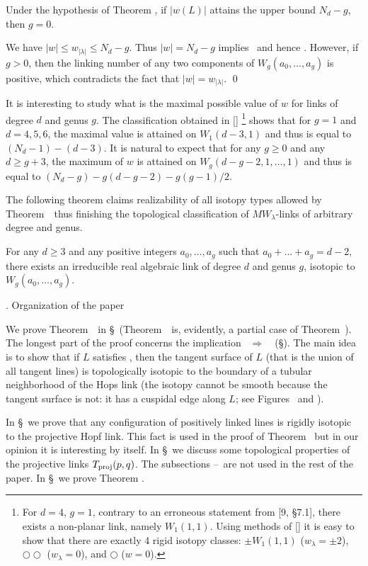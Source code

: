  Under the hypothesis of Theorem \thAnyGenus, if $|w(L)|$ attains
the upper bound $N_d-g$, then $g=0$.
\endproclaim

 We have $|w|\le w_{|\lambda|}\le N_d-g$. Thus $|w|=N_d-g$ implies \CondW\ and hence \CondTA.
However, if $g>0$, then the linking number of any two components of $W_g(a_0,\dots,a_g)$
is positive, which contradicts the fact that $|w|=w_{|\lambda|}$.
\qed\enddemo

It is interesting to study what is the maximal possible value of $w$ for links of degree $d$ and genus $g$.
The classification obtained in []
%
\footnote{For $d=4$, $g=1$, contrary to an erroneous statement from [9, \S 7.1], there
exists a non-planar link, namely $W_1(1,1)$. Using methods of [] it is easy to show
that there are exactly 4 rigid isotopy classes: $\pm W_1(1,1)$ ($w_\lambda=\pm2$),
$\bigcirc\bigcirc$ ($w_\lambda=0$), and $\bigcirc$ ($w=0$).}
shows that for $g=1$ and $d=4,5,6$, the maximal value
is attained on $W_1(d-3,1)$ and thus is equal to $(N_d-1)-(d-3)$. It is natural to expect that for any $g\ge0$ and
any $d\ge g+3$, the maximum of $w$ is attained on $W_g(d-g-2,1,\dots,1)$ and thus is equal to
$(N_d-g) - g(d-g-2) - g(g-1)/2$.

\smallskip
The following theorem claims realizability of all isotopy types
allowed by Theorem~\thAnyGenus\ thus finishing the topological classification
of $MW_\lambda$-links of arbitrary degree and genus.

For any $d\ge3$ and any positive integers
$a_0,\dots,a_g$ such that $a_0+\dots+a_g=d-2$, there exists an irreducible real algebraic link of degree
$d$ and genus $g$, isotopic to $W_g(a_0,\dots,a_g)$.
\endproclaim


\smallskip
{}. Organization of the paper \endsubhead

We prove Theorem~\thAnyGenus\ in \S\sectProofMainTh\ (Theorem~\thMain\ is, evidently, a partial case of
Theorem~\thAnyGenus). The longest part of the proof concerns the implication
\CondH~$\Rightarrow$~\CondTA\ (\S\sectT). The main idea is to show that if $L$ satisfies \CondH,
then the tangent surface of $L$ (that is the union of all tangent lines) is topologically isotopic
to the boundary of a tubular neighborhood of the Hops link (the isotopy cannot be smooth because
the tangent surface is not: it has a cuspidal edge along $L$; see Figures \figChu\ and \figChuInv).

In \S\sectHopf\ we prove that any configuration of positively linked lines is rigidly isotopic
to the projective Hopf link. This fact is used in the proof of Theorem \thAnyGenus\ but
in our opinion it is interesting by itself.
In \S\sectPermut\ we discuss some topological properties of the projective links $T_{\operatorname{proj}}(p,q)$.
The subsections \sectDiagr--\sectPermutLast\ are not used in the rest of the paper.
In \S\sectExist\ we prove Theorem \thExist.


